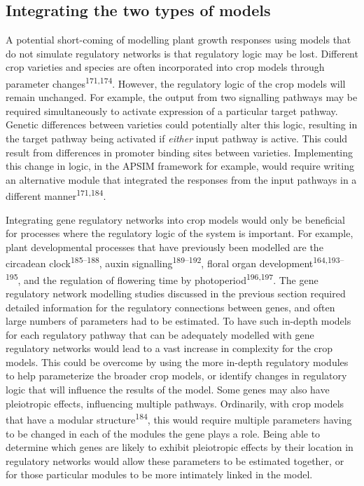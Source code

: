 \documentclass[12pt,]{book}
\begin{document}
\subsection{Integrating the two types of
models}\label{integrating-the-two-types-of-models}

A potential short-coming of modelling plant growth responses using
models that do not simulate regulatory networks is that regulatory logic
may be lost. Different crop varieties and species are often incorporated
into crop models through parameter changes\textsuperscript{171,174}.
However, the regulatory logic of the crop models will remain unchanged.
For example, the output from two signalling pathways may be required
simultaneously to activate expression of a particular target pathway.
Genetic differences between varieties could potentially alter this
logic, resulting in the target pathway being activated if \emph{either}
input pathway is active. This could result from differences in promoter
binding sites between varieties. Implementing this change in logic, in
the APSIM framework for example, would require writing an alternative
module that integrated the responses from the input pathways in a
different manner\textsuperscript{171,184}.

Integrating gene regulatory networks into crop models would only be
beneficial for processes where the regulatory logic of the system is
important. For example, plant developmental processes that have
previously been modelled are the circadean
clock\textsuperscript{185--188}, auxin
signalling\textsuperscript{189--192}, floral organ
development\textsuperscript{164,193--195}, and the regulation of
flowering time by photoperiod\textsuperscript{196,197}. The gene
regulatory network modelling studies discussed in the previous section
required detailed information for the regulatory connections between
genes, and often large numbers of parameters had to be estimated. To
have such in-depth models for each regulatory pathway that can be
adequately modelled with gene regulatory networks would lead to a vast
increase in complexity for the crop models. This could be overcome by
using the more in-depth regulatory modules to help parameterize the
broader crop models, or identify changes in regulatory logic that will
influence the results of the model. Some genes may also have pleiotropic
effects, influencing multiple pathways. Ordinarily, with crop models
that have a modular structure\textsuperscript{184}, this would require
multiple parameters having to be changed in each of the modules the gene
plays a role. Being able to determine which genes are likely to exhibit
pleiotropic effects by their location in regulatory networks would allow
these parameters to be estimated together, or for those particular
modules to be more intimately linked in the model.
\end{document}
